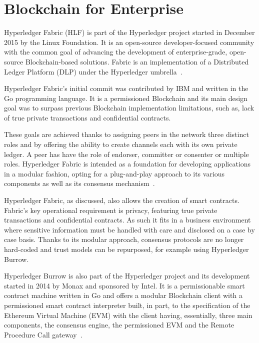 \section{Blockchain for Enterprise} \label{enterpriseBlockchain}

Hyperledger Fabric (HLF) is part of the Hyperledger project started in December
2015 by the Linux Foundation. It is an open-source developer-focused community
with the common goal of advancing the development of enterprise-grade,
open-source Blockchain-based solutions.  Fabric is an implementation of a
Distributed Ledger Platform (DLP) under the Hyperledger
umbrella~\cite{Cachin2016}.

Hyperledger Fabric’s initial commit was contributed by IBM and written in the
Go programming language.  It is a permissioned Blockchain and its main design
goal was to surpass previous Blockchain implementation limitations, such as,
lack of true private transactions and confidential contracts.

These goals are achieved thanks to assigning peers in the network three
distinct roles and by offering the ability to create channels each with its own
private ledger.  A peer has have the role of endorser, committer or consenter
or multiple roles.  Hyperledger Fabric is intended as a foundation for
developing applications in a modular fashion, opting for a plug-and-play
approach to its various components as well as its consensus
mechanism~\cite{HyperledgerFabricDocs2017}.

Hyperledger Fabric, as discussed, also allows the creation of smart contracts.
Fabric's key operational requirement is privacy, featuring true private
transactions and confidential contracts. As such it fits in a business
environment where sensitive information must be handled with care and disclosed
on a case by case basis. Thanks to its modular approach, consensus protocols
are no longer hard-coded and trust models can be repurposed, for example using
Hyperledger Burrow.

Hyperledger Burrow is also part of the Hyperledger project and its development
started in 2014 by Monax and sponsored by Intel. It is a permissionable smart
contract machine written in Go and offers a modular Blockchain client with a
permissioned smart contract interpreter built, in part, to the specification of
the Ethereum Virtual Machine (EVM) with the client having, essentially, three
main components, the consensus engine, the permissioned EVM and the Remote
Procedure Call gateway~\cite{Kuhlman2017,HyperledgerBurrow2017}.

